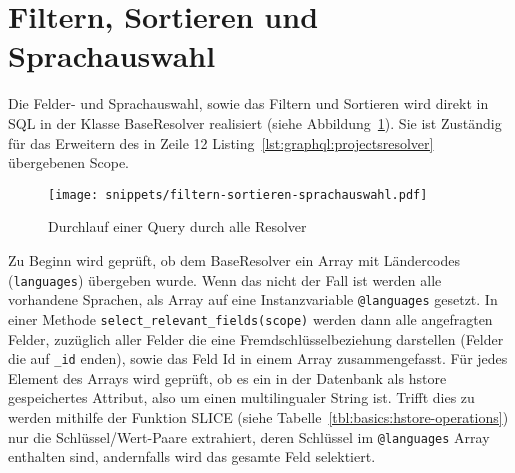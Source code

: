 \section{Filtern, Sortieren und Sprachauswahl}
\label{impl:base-resolver}
Die Felder- und Sprachauswahl, sowie das Filtern und Sortieren wird direkt in SQL in der Klasse BaseResolver realisiert (siehe Abbildung~\ref{graphql:sorting}). 
Sie ist Zuständig für das Erweitern des in Zeile 12 Listing~\ref{lst:graphql:projectsresolver} übergebenen Scope.

\begin{figure}[h!]
	\centering
	\texttt{[image: snippets/filtern-sortieren-sprachauswahl.pdf]}
	\caption{Durchlauf einer Query durch alle Resolver}
	\label{graphql:sorting}
\end{figure}


Zu Beginn wird geprüft, ob dem BaseResolver ein Array mit Ländercodes (\lstinline|languages|) übergeben wurde. Wenn das nicht der Fall ist werden alle vorhandene Sprachen, als Array auf eine Instanzvariable \lstinline|@languages| gesetzt. In einer Methode \lstinline|select_relevant_fields(scope)| werden dann alle angefragten Felder, zuzüglich aller Felder die eine Fremdschlüsselbeziehung darstellen (Felder die auf \lstinline|_id| enden), sowie das Feld Id in einem Array zusammengefasst. Für jedes Element des Arrays wird geprüft, ob es ein in der Datenbank als hstore gespeichertes Attribut, also um einen multilingualer String ist.
Trifft dies zu werden mithilfe der Funktion SLICE (siehe Tabelle~\ref{tbl:basics:hstore-operations}) nur die Schlüssel/Wert-Paare extrahiert, deren Schlüssel im \lstinline|@languages| Array enthalten sind, andernfalls wird das gesamte Feld selektiert.


